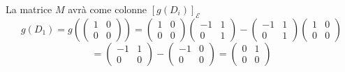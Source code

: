 \documentclass[a4paper]{article}
\theoremstyle{break}
\theoremstyle{break}
\theoremstyle{break}
\theoremstyle{break}
\begin{document}
\begin{enumerate}
        \vspace{1em}
        La matrice \( M \) avrà come colonne \( [g(D_i)]_{\mathcal{E}} \) 
        \[
        g(D_1) = g \left( \begin{pmatrix} 1 & 0\\0 & 0 \end{pmatrix} \right) =
        \begin{pmatrix} 
          1 & 0\\
          0 & 0
        \end{pmatrix} 
        \begin{pmatrix} 
          -1 & 1\\
          0 & 1
        \end{pmatrix} 
        -
        \begin{pmatrix} 
          -1 & 1\\
          0 & 1
        \end{pmatrix} 
        \begin{pmatrix} 
          1 & 0\\
          0 & 0
        \end{pmatrix} 
        \] 
        \[
        = \begin{pmatrix} 
          -1 & 1\\
          0 & 0
        \end{pmatrix} 
        -
        \begin{pmatrix} 
          -1 & 0\\
          0 & 0
        \end{pmatrix} 
        =
        \begin{pmatrix} 
          0 & 1\\
          0 & 0
        \end{pmatrix} 
        \] 


\end{enumerate}
\end{document}
